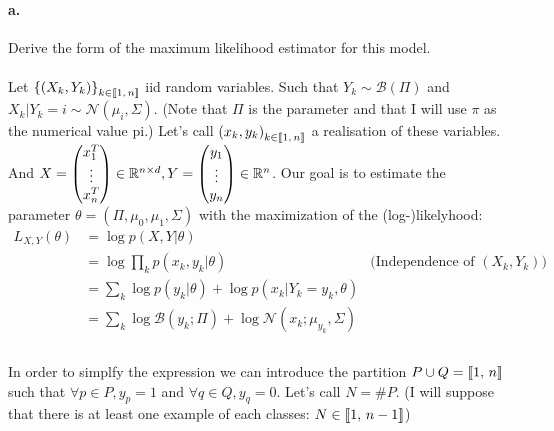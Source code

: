 \documentclass{article}
\begin{document}
\paragraph{a.} Derive the form of the maximum likelihood estimator for this model.\\
\vspace{5px}\\
Let $\left\{(X_k, Y_k)\right\}_{k \in \left\llbracket1,\, n\right\rrbracket}$ iid random variables. Such that $Y_k \sim \mathcal{B}(\Pi)$ and $X_k | Y_k=i \sim \mathcal{N}(\mu_i, \Sigma)$. (Note that $\Pi$
is the parameter and that I will use $\pi$ as the numerical value pi.) Let's call ${(x_k, y_k)}_{k \in \left\llbracket1,\, n\right\rrbracket}$ a realisation of these variables.
And $X = \begin{pmatrix} x_1^T \\ \vdots \\ x_n^T \end{pmatrix} \in \mathbb{R}^{n \times d}, Y = \begin{pmatrix} y_1 \\ \vdots \\ y_n \end{pmatrix} \in \mathbb{R}^n$. Our
goal is to estimate the parameter $\theta = (\Pi, \mu_0, \mu_1, \Sigma)$ with the maximization of the (log-)likelyhood:
\begin{equation*}
    \begin{aligned}
        L_{X, Y}(\theta) & = \log p(X, Y | \theta)                                                         &                                       \\
                         & = \log \prod_k p(x_k, y_k | \theta)                                             & \text{(Independence of $(X_k, Y_k)$)} \\
                         & = \sum_k \log p(y_k | \theta)  + \log p(x_k | Y_k=y_k, \theta)                  &                                       \\
                         & = \sum_k \log \mathcal{B}(y_k; \Pi)  + \log \mathcal{N}(x_k; \mu_{y_k}, \Sigma) &                                       \\
    \end{aligned}
\end{equation*}\\
In order to simplfy the expression we can introduce the partition
$P \cup Q = \left\llbracket1,\, n\right\rrbracket$ such that $\forall p \in P, y_p=1$ and $\forall q \in Q, y_q=0$. Let's call $N = \#P$.
(I will suppose that there is at least one example of each classes: $N \in \left\llbracket1,\, n-1\right\rrbracket$)
\end{document}
